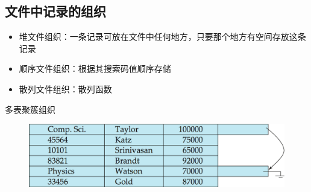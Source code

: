 \subsection{文件中记录的组织}
\begin{itemize}
	\item 堆文件组织：一条记录可放在文件中任何地方，只要那个地方有空间存放这条记录
	\item 顺序文件组织：根据其搜索码值顺序存储
	\item 散列文件组织：散列函数
\end{itemize}

多表聚簇组织
\begin{figure}[H]
\centering
\includegraphics[width=0.5\linewidth]{fig/multitable_clustering.png}
\end{figure}